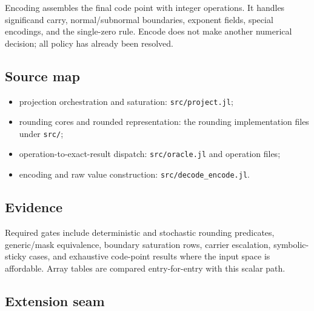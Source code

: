 Encoding assembles the final code point with integer operations. It handles significand carry, normal/subnormal boundaries, exponent fields, special encodings, and the single-zero rule. Encode does not make another numerical decision; all policy has already been resolved.



\subsection{Source map}



\label{18273178321310211874-dup1}{}


\begin{itemize}
\item projection orchestration and saturation: \texttt{src/project.jl};


\item rounding cores and rounded representation: the rounding implementation files under \texttt{src/};


\item operation-to-exact-result dispatch: \texttt{src/oracle.jl} and operation files;


\item encoding and raw value construction: \texttt{src/decode\_\allowbreak{}encode.jl}.

\end{itemize}


\subsection{Evidence}



\label{13132603241474770426-dup1}{}


Required gates include deterministic and stochastic rounding predicates, generic/mask equivalence, boundary saturation rows, carrier escalation, symbolic-sticky cases, and exhaustive code-point results where the input space is affordable. Array tables are compared entry-for-entry with this scalar path.



\subsection{Extension seam}



\label{12435378766327693060-dup1}{}


